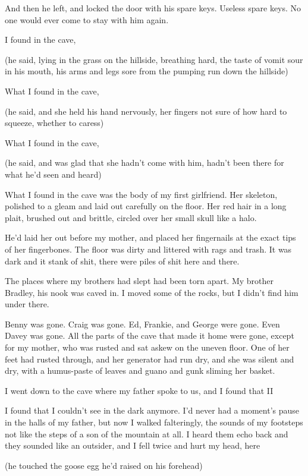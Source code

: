 And then he left, and locked the door with his spare keys.  Useless
spare keys.  No one would ever come to stay with him again.

 I found in the cave,

(he said, lying in the grass on the hillside, breathing hard, the
taste of vomit sour in his mouth, his arms and legs sore from the
pumping run down the hillside)

What I found in the cave,

(he said, and she held his hand nervously, her fingers not sure of how
hard to squeeze, whether to caress)

What I found in the cave,

(he said, and was glad that she hadn't come with him, hadn't been
there for what he'd seen and heard)

What I found in the cave was the body of my first girlfriend.  Her
skeleton, polished to a gleam and laid out carefully on the floor. 
Her red hair in a long plait, brushed out and brittle, circled over
her small skull like a halo.

He'd laid her out before my mother, and placed her fingernails at the
exact tips of her fingerbones.  The floor was dirty and littered with
rags and trash.  It was dark and it stank of shit, there were piles of
shit here and there.

The places where my brothers had slept had been torn apart.  My
brother Bradley, his nook was caved in.  I moved some of the rocks,
but I didn't find him under there.

Benny was gone.  Craig was gone.  Ed, Frankie, and George were gone. 
Even Davey was gone.  All the parts of the cave that made it home were
gone, except for my mother, who was rusted and sat askew on the uneven
floor.  One of her feet had rusted through, and her generator had run
dry, and she was silent and dry, with a humus-paste of leaves and
guano and gunk sliming her basket.

I went down to the cave where my father spoke to us, and I found that
I\dash{}I\dash{}

I found that I couldn't see in the dark anymore.  I'd never had a
moment's pause in the halls of my father, but now I walked
falteringly, the sounds of my footsteps not like the steps of a son of
the mountain at all.  I heard them echo back and they sounded like an
outsider, and I fell twice and hurt my head, here\dash{}

(he touched the goose egg he'd raised on his forehead)

